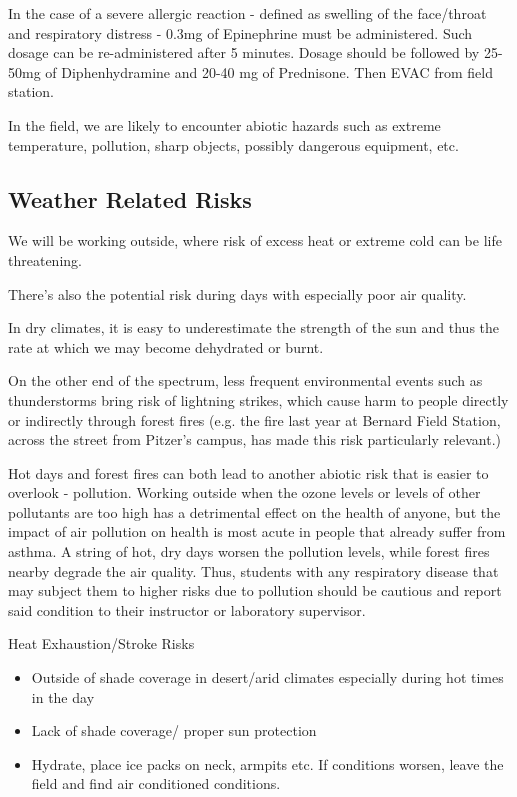 \documentclass[12pt]{../SOP3_beta}\usepackage[]{graphicx}\usepackage[]{color}
\begin{document}
\NP In the case of a severe allergic reaction - defined as swelling of the face/throat and respiratory distress - 0.3mg of Epinephrine must be administered. Such dosage can be re-administered after 5 minutes. Dosage should be followed by 25-50mg of Diphenhydramine and 20-40 mg of Prednisone. Then EVAC from field station. 

\NP In the field, we are likely to encounter abiotic hazards such as extreme temperature, pollution, sharp objects, possibly dangerous equipment, etc.

\subsection{Weather Related Risks}

\NP We will be working outside, where risk of excess heat or extreme cold can be life threatening. 

\NP There's also the potential risk during days with especially poor air quality. 

\NP In dry climates, it is easy to underestimate the strength of the sun and thus the rate at which we may become dehydrated or burnt.  

\NP On the other end of the spectrum, less frequent environmental events such as thunderstorms bring risk of lightning strikes, which cause harm to people directly or indirectly through forest fires (e.g. the fire last year at Bernard Field Station, across the street from Pitzer's campus, has made this risk particularly relevant.)

\NP Hot days and forest fires can both lead to another abiotic risk that is easier to overlook - pollution. Working outside when the ozone levels or levels of other pollutants are too high has a detrimental effect on the health of anyone, but the impact of air pollution on health is most acute in people that already suffer from asthma. A string of hot, dry days worsen the pollution levels, while forest fires nearby degrade the air quality. Thus, students with any respiratory disease that may subject them to higher risks due to pollution should be cautious and report said condition to their instructor or laboratory supervisor. 

\NP Heat Exhaustion/Stroke Risks

\begin{itemize}
  \item Outside of shade coverage in desert/arid climates especially during hot times in the day
  \item Lack of shade coverage/ proper sun protection
  \item Hydrate, place ice packs on neck, armpits etc. If conditions worsen, leave the field and find air conditioned conditions.
  \end{itemize}  
  
\end{document}
